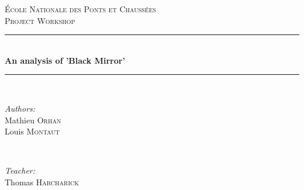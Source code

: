 \documentclass{article}
\date{30 avril 2017}
\begin{document}
\begin{titlepage}

\newcommand{\HRule}{\rule{\linewidth}{0.5mm}} %

\center %
 

\textsc{\LARGE École Nationale des Ponts et Chaussées}\\[1.5cm] %
\textsc{\Large Project Workshop}\\[0.5cm] %


\HRule \\[0.4cm]
{ \huge \bfseries An analysis of 'Black Mirror'}\\[0.4cm] %
\HRule \\[1.5cm]
 

\begin{minipage}{0.4\textwidth}
\begin{flushleft} \large
\emph{Authors:}\\
Mathieu \textsc{Orhan}\\ Louis \textsc{Montaut} %
\end{flushleft}
\end{minipage}
~
\begin{minipage}{0.4\textwidth}
\begin{flushright} \large
\emph{Teacher:} \\
Thomas \textsc{Harcharick} %
\end{flushright}
\end{minipage}\\[2cm]



\end{titlepage}
\end{document}
